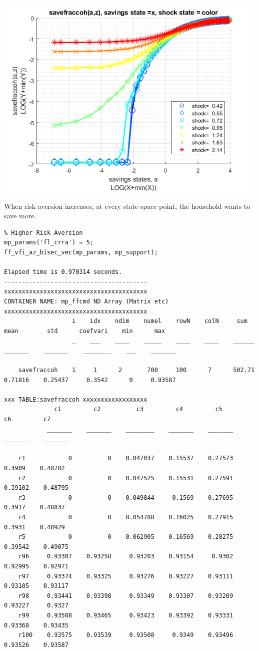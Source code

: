 \documentclass[
]{book}
\begin{document}
\includegraphics[width=5.20833in,height=\textheight]{img/fx_vfi_az_bisec_vec_images/figure_3.png}

When risk aversion increases, at every state-space point, the household
wants to save more.

\begin{verbatim}
% Higher Risk Aversion
mp_params('fl_crra') = 5;
ff_vfi_az_bisec_vec(mp_params, mp_support);

Elapsed time is 0.970314 seconds.
----------------------------------------
xxxxxxxxxxxxxxxxxxxxxxxxxxxxxxxxxxxxxxxx
CONTAINER NAME: mp_ffcmd ND Array (Matrix etc)
xxxxxxxxxxxxxxxxxxxxxxxxxxxxxxxxxxxxxxxx
                   i    idx    ndim    numel    rowN    colN     sum       mean        std      coefvari    min      max  
                   _    ___    ____    _____    ____    ____    ______    _______    _______    ________    ___    _______

    savefraccoh    1     1      2       700     100      7      502.71    0.71816    0.25437     0.3542      0     0.93587

xxx TABLE:savefraccoh xxxxxxxxxxxxxxxxxx
              c1         c2          c3         c4         c5         c6         c7   
            _______    _______    ________    _______    _______    _______    _______

    r1            0          0    0.047037    0.15537    0.27573     0.3909    0.48782
    r2            0          0    0.047525    0.15531    0.27591    0.39102    0.48795
    r3            0          0    0.049844     0.1569    0.27695     0.3917    0.48837
    r4            0          0    0.054788    0.16025    0.27915     0.3931    0.48929
    r5            0          0    0.062905    0.16569    0.28275    0.39542    0.49075
    r96     0.93307    0.93258     0.93203    0.93154     0.9302    0.92995    0.92971
    r97     0.93374    0.93325     0.93276    0.93227    0.93111    0.93105    0.93117
    r98     0.93441    0.93398     0.93349    0.93307    0.93209    0.93227     0.9327
    r99     0.93508    0.93465     0.93423    0.93392    0.93331    0.93368    0.93435
    r100    0.93575    0.93539     0.93508     0.9349    0.93496    0.93526    0.93587
\end{verbatim}
\end{document}
